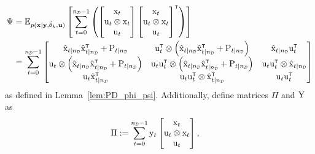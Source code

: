 \begin{equation}
\begin{split}
    \Psi &=   \mathbb{E}_{p(\mathbf{x}|\mathbf{y},\hat{\vctheta}_k,\mathbf{u})} \left[ \sum_{t=0}^{\nD - 1} \left(\begin{bmatrix}
        \vcx_t \\ \vcu_t \otimes \vcx_t \\ \vcu_t
    \end{bmatrix}
    \begin{bmatrix}
        \vcx_t \\ \vcu_t \otimes \vcx_t \\ \vcu_t
    \end{bmatrix}^\tr \right)\right]
    \\ &
    =\sum_{t=0}^{\nD-1}
    \begin{bmatrix} 
    \hat{\vcx}_{t|\nD} \hat{\vcx}_{t|\nD}^\tr + \mxP_{t|\nD} 
    & \vcu_t^\tr \otimes \left(\hat{\vcx}_{t|\nD} \hat{\vcx}_{t|\nD}^\tr + \mxP_{t|\nD} \right) 
    & \hat{\vcx}_{t|\nD} \vcu_t^\tr \\ 
    \vcu_t \otimes \left(\hat{\vcx}_{t|\nD} \hat{\vcx}_{t|\nD}^\tr + \mxP_{t|\nD} \right)
    & \vcu_t \vcu_t^\tr \otimes \left(\hat{\vcx}_{t|\nD} \hat{\vcx}_{t|\nD}^\tr + \mxP_{t|\nD} \right)
    & \vcu_t\vcu_t^\tr \otimes \hat{\vcx}_{t|\nD}\\
    \vcu_t \hat{\vcx}_{t|\nD}^\tr 
    & \vcu_t \vcu_t^\tr \otimes \hat{\vcx}_{t|\nD}^\tr
    & \vcu_t \vcu_t^\tr 
    \end{bmatrix}
\end{split}
\end{equation}
as defined in Lemma~\ref{lem:PD_phi_psi}.
Additionally, define matrices $\Pi$ and ${ \mathrm{Y} }$ as
\begin{equation}
\begin{split}
    \Pi &:= \sum_{t=0}^{\nD-1} \vcy_t
    \begin{bmatrix}
        \vcx_t \\ \vcu_t \otimes \vcx_t \\ \vcu_t
    \end{bmatrix},
\end{split}
\end{equation}
